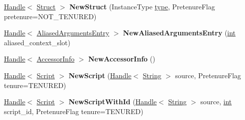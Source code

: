 \begin{DoxyCompactItemize}
\item 
\mbox{\label{classv8_1_1internal_1_1Factory_a88965f5235205ef661ab8e5ca49ae276}} 
\mbox{\hyperlink{classv8_1_1internal_1_1Handle}{Handle}}$<$ \mbox{\hyperlink{classv8_1_1internal_1_1Struct}{Struct}} $>$ {\bfseries New\+Struct} (Instance\+Type \mbox{\hyperlink{classstd_1_1conditional_1_1type}{type}}, Pretenure\+Flag pretenure=N\+O\+T\+\_\+\+T\+E\+N\+U\+R\+ED)
\item 
\mbox{\label{classv8_1_1internal_1_1Factory_a03d8e5a43a14d06db90b75afccf4667a}} 
\mbox{\hyperlink{classv8_1_1internal_1_1Handle}{Handle}}$<$ \mbox{\hyperlink{classv8_1_1internal_1_1AliasedArgumentsEntry}{Aliased\+Arguments\+Entry}} $>$ {\bfseries New\+Aliased\+Arguments\+Entry} (\mbox{\hyperlink{classint}{int}} aliased\+\_\+context\+\_\+slot)
\item 
\mbox{\label{classv8_1_1internal_1_1Factory_afc26e671a6f7bfc31bf002f7398718cc}} 
\mbox{\hyperlink{classv8_1_1internal_1_1Handle}{Handle}}$<$ \mbox{\hyperlink{classv8_1_1internal_1_1AccessorInfo}{Accessor\+Info}} $>$ {\bfseries New\+Accessor\+Info} ()
\item 
\mbox{\label{classv8_1_1internal_1_1Factory_a921e4f7a02f7718ef1473a790472c53f}} 
\mbox{\hyperlink{classv8_1_1internal_1_1Handle}{Handle}}$<$ \mbox{\hyperlink{classv8_1_1internal_1_1Script}{Script}} $>$ {\bfseries New\+Script} (\mbox{\hyperlink{classv8_1_1internal_1_1Handle}{Handle}}$<$ \mbox{\hyperlink{classv8_1_1internal_1_1String}{String}} $>$ source, Pretenure\+Flag tenure=T\+E\+N\+U\+R\+ED)
\item 
\mbox{\label{classv8_1_1internal_1_1Factory_a8fce72c240d731c277ca5d3157c3ec37}} 
\mbox{\hyperlink{classv8_1_1internal_1_1Handle}{Handle}}$<$ \mbox{\hyperlink{classv8_1_1internal_1_1Script}{Script}} $>$ {\bfseries New\+Script\+With\+Id} (\mbox{\hyperlink{classv8_1_1internal_1_1Handle}{Handle}}$<$ \mbox{\hyperlink{classv8_1_1internal_1_1String}{String}} $>$ source, \mbox{\hyperlink{classint}{int}} script\+\_\+id, Pretenure\+Flag tenure=T\+E\+N\+U\+R\+ED)
\item 
\mbox{\label{classv8_1_1internal_1_1Factory_af2445acf7949b63261b6f8a35d92bd92}} 

\end{DoxyCompactItemize}

